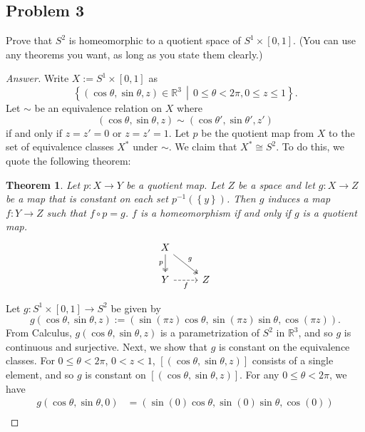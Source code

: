 \documentclass[12pt]{article}
\newcommand{\real}{\mathbb{R}}
\newcommand\inv[1]{#1^{-1}}
\newcommand\paren[1]{\left( #1 \right)}
\newcommand\setb[1]{\left \{ #1 \right \}}
\newcommand{\sqbrack}[1]{\left [ #1 \right ]}
\newtheorem{theorem}{Theorem}[section]
\theoremstyle{definition}
\begin{document}
\subsection{Problem 3 \texorpdfstring{\cite{Munkres,Leon}}{}}
Prove that $S^2$ is homeomorphic to a quotient space of $S^1 \times [0,1]$. (You can use any theorems you want, as long as you state them clearly.)
\begin{proof}[Answer]
    Write $X := S^1 \times [0,1]$ as 
    \[
        \setb{ \paren{ \cos \theta , \sin \theta , z } \in \real^3 \, \middle| \, 0 \leq \theta < 2\pi , 0 \leq z \leq 1 }.
    \]
    Let $\sim$ be an equivalence relation on $X$ where 
    \[
        \paren{ \cos \theta , \sin \theta , z } \sim \paren{ \cos \theta' , \sin \theta' , z' }
    \]
    if and only if $z = z' = 0$ or $z = z' = 1$. Let $p$ be the quotient map from $X$ to the set of equivalence classes $X^*$ under $\sim$. We claim that $X^* \cong S^2$. To do this, we quote the following theorem:
    \begin{theorem}
        Let $p : X \to Y$ be a quotient map. Let $Z$ be a space and let $g : X \to Z$ be a map that is constant on each set $\inv{p} \paren{ \setb{ y } }$. Then $g$ induces a map $f : Y \to Z$ such that $f \circ p = g$. $f$ is a homeomorphism if and only if $g$ is a quotient map. 
        \[
            \begin{tikzcd}
                X \arrow[d,"p"',twoheadrightarrow] \arrow[dr,"g",twoheadrightarrow]\\
                Y \arrow[r,"f"',dashed] & Z
            \end{tikzcd}
        \]
    \end{theorem}
    Let $g : S^1 \times [0,1] \to S^2$ be given by 
    \[
        g \paren{ \cos \theta , \sin \theta , z } := \paren{ \sin \paren{ \pi z } \cos \theta , \sin \paren{ \pi z } \sin \theta , \cos \paren{ \pi z } }.
    \]
    From Calculus, $g \paren{ \cos \theta , \sin \theta , z }$ is a parametrization of $S^2$ in $\real^3$, and so $g$ is continuous and surjective. Next, we show that $g$ is constant on the equivalence classes. For $0 \leq \theta < 2\pi$, $0 < z < 1$, $\sqbrack{ \paren{ \cos \theta , \sin \theta , z } }$ consists of a single element, and so $g$ is constant on $\sqbrack{ \paren{ \cos \theta , \sin \theta , z } }$. For any $0 \leq \theta < 2\pi$, we have 
    \begin{align*}
        g \paren{ \cos \theta , \sin \theta , 0 } & = \paren{ \sin \paren{ 0 } \cos \theta , \sin \paren{0} \sin \theta , \cos \paren{0} } \\

\end{align*}
\end{proof}
\end{document}
